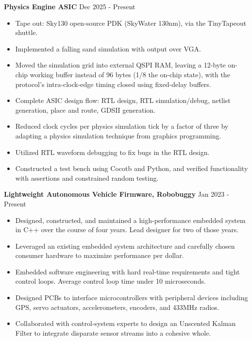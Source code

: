 \documentclass[10pt,letterpaper]{article}
\newcommand{\tightlist}{%
  \setlength{\itemsep}{0pt}%
  \setlength{\leftmargin}{1.0em}%
  \setlength{\parskip}{0pt}%
  \setlength{\topsep}{1.5pt}%
  \setlength{\parsep}{0pt}%
}
\newlength{\cvkeepskip}
\newcommand{\cvkeep}[1]{%
  \begingroup
    \setlength{\cvkeepskip}{#1}%
    \ifdim\pagegoal<\maxdimen
      \addtolength{\cvkeepskip}{\pagetotal}%
      \ifdim\cvkeepskip>\pagegoal
        \newpage
      \fi
    \fi
  \endgroup
}
\newcommand{\entrysep}{\vspace{2pt}\cvkeep{140pt}}
\newcommand{\cvwhen}[1]{\textsf{#1}}%
\begin{document}
\entrysep
\textbf{Physics Engine ASIC} \hfill \cvwhen{Dec 2025 - Present}
\begin{itemize}\tightlist
  \item Tape out: Sky130 open-source PDK (SkyWater 130nm), via the TinyTapeout shuttle.
  \item Implemented a falling sand simulation with output over VGA.
  \item Moved the simulation grid into external QSPI RAM, leaving a 12-byte
    on-chip working buffer instead of 96 bytes (1/8 the on-chip state), with the
    protocol's intra-clock-edge timing closed using fixed-delay buffers.
  \item Complete ASIC design flow: RTL design, RTL simulation/debug, netlist
    generation, place and route, GDSII generation.
  \item Reduced clock cycles per physics simulation tick by a factor of three
    by adapting a physics simulation technique from graphics programming.
  \item Utilized RTL waveform debugging to fix bugs in the RTL design.
  \item Constructed a test bench using Cocotb and Python, and verified
    functionality with assertions and constrained random testing.
\end{itemize}

\entrysep
\textbf{Lightweight Autonomous Vehicle Firmware, Robobuggy} \hfill
\cvwhen{Jan 2023 - Present}
\begin{itemize}\tightlist
  \item Designed, constructed, and maintained a high-performance embedded
    system in C++ over the course of four years. Lead designer for two of those
    years.
  \item Leveraged an existing embedded system architecture and carefully chosen
    consumer hardware to maximize performance per dollar.
  \item Embedded software engineering with hard real-time requirements and
    tight control loops. Average control loop time under 10 microseconds.
  \item Designed PCBs to interface microcontrollers with peripheral devices
    including GPS, servo actuators, accelerometers, encoders, and 433MHz radios.
  \item Collaborated with control-system experts to design an Unscented Kalman
    Filter to integrate disparate sensor streams into a cohesive whole.
\end{itemize}
\end{document}
